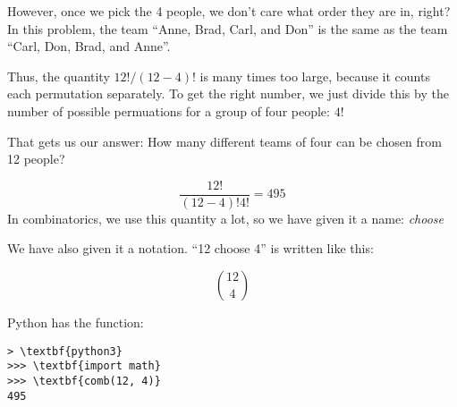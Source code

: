 However, once we pick the 4 people, we don't care what order they are
in, right?  In this problem, the team ``Anne, Brad, Carl, and Don'' is
the same as the team ``Carl, Don, Brad, and Anne''.

Thus, the quantity $12! / (12 - 4)!$ is many times too large, because
it counts each permutation separately. To get the right number, we
just divide this by the number of possible permuations for a group of
four people: $4!$

That gets us our answer: How many different teams of four can be chosen from 12 people?

$$\frac{12!}{(12-4)! 4!}= 495$$
In combinatorics, we use this quantity a lot, so we have given it a name: \textit{choose}

We have also given it a notation. ``12 choose 4'' is written like this:

$${12 \choose 4}$$

Python has the  function:

\begin{Verbatim}[commandchars=\\\{\}]
> \textbf{python3}
>>> \textbf{import math}
>>> \textbf{comb(12, 4)}
495  
\end{Verbatim}

